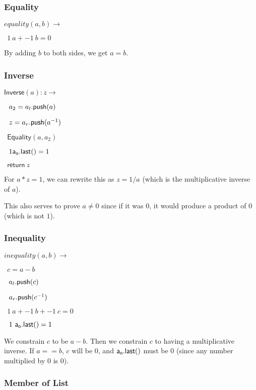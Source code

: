 \documentclass[]{article}
\begin{document}
\newcommand{\all}{\mathsf{a_l.last()}}
\newcommand{\arl}{\mathsf{a_r.last()}}

\newpage

\subsubsection{Equality}

\newcommand{\equality}{\mathsf{Equality}}

$equality(a, b) \rightarrow$

$~~1 ~a + -1 ~b = 0$

By adding $b$ to both sides, we get $a = b$.

\subsubsection{Inverse}

\newcommand{\inverse}{\mathsf{Inverse}}

$\inverse(a): z \rightarrow$

$~~a_2 = a_l\mathsf{.push}(a)$

$~~z = a_r\mathsf{.push}(a^{-1})$

$~~\equality(a, a_2)$

$~~1 \mathsf{a_o.last()} = 1$

$~~\mathsf{return} ~z$

For $a * z = 1$, we can rewrite this as $z = 1/a$ (which is the multiplicative inverse of $a$).

This also serves to prove $a \ne 0$ since if it was $0$, it would produce a product of $0$ (which is not $1$).

\subsubsection{Inequality}

\newcommand{\inequality}{\mathsf{Inequality}}

$inequality(a, b) \rightarrow$

$~~c = a - b$

$~~a_l\mathsf{.push}(c)$

$~~a_r\mathsf{.push}(c^{-1})$

$~~1 ~a + -1 ~b + -1 ~c = 0$

$~~1 ~\mathsf{a_o.last()} = 1$

We constrain $c$ to be $a - b$. Then we constrain $c$ to having a multiplicative inverse. If $a == b$, $c$ will be $0$, and $\mathsf{a_o.last()}$ must be $0$ (since any number multiplied by $0$ is $0$).

\subsubsection{Member of List}
\end{document}
